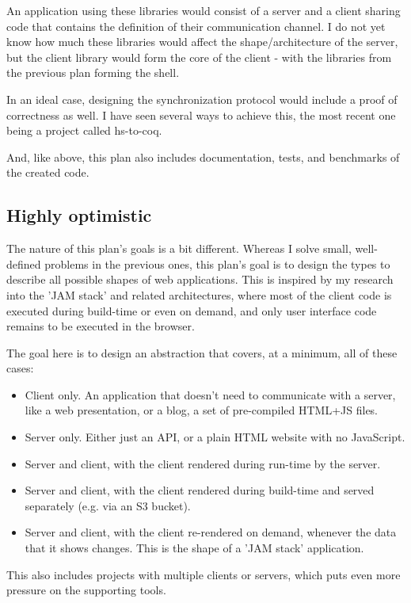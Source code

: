 \documentclass[11pt,a4paper]{scrartcl}
\begin{document}
An application using these libraries would consist of a server and a client
sharing code that contains the definition of their communication channel. I do
not yet know how much these libraries would affect the shape/architecture of the
server, but the client library would form the core of the client - with the
libraries from the previous plan forming the shell.

In an ideal case, designing the synchronization protocol would include a proof
of correctness as well. I have seen several ways to achieve this, the most
recent one being a project called hs-to-coq.

And, like above, this plan also includes documentation, tests, and benchmarks of
the created code.

\subsection{Highly optimistic}
\label{sec:org06cde1c}
The nature of this plan's goals is a bit different. Whereas I solve small,
well-defined problems in the previous ones, this plan's goal is to design the
types to describe all possible shapes of web applications. This is inspired by
my research into the 'JAM stack' and related architectures, where most of the
client code is executed during build-time or even on demand, and only user
interface code remains to be executed in the browser.

The goal here is to design an abstraction that covers, at a minimum, all of
these cases:
\begin{itemize}
\item Client only. An application that doesn't need to communicate with a server,
like a web presentation, or a blog, a set of pre-compiled HTML+JS files.
\item Server only. Either just an API, or a plain HTML website with no JavaScript.
\item Server and client, with the client rendered during run-time by the server.
\item Server and client, with the client rendered during build-time and served
separately (e.g. via an S3 bucket).
\item Server and client, with the client re-rendered on demand, whenever the data that
it shows changes. This is the shape of a 'JAM stack' application.
\end{itemize}

This also includes projects with multiple clients or servers, which puts even
more pressure on the supporting tools.
\end{document}
